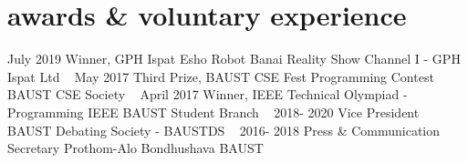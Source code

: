 \section*{awards \& voluntary experience}
\begin{entrylist}
	\myentry
	{July 2019}
	{Winner, {\normalfont GPH Ispat Esho Robot Banai Reality Show}}
	{Channel I - GPH Ispat Ltd}
	~
	\myentry
	{May 2017}
	{Third Prize, {\normalfont BAUST CSE Fest Programming Contest}}
	{BAUST CSE Society}
	~
	\myentry
	{April 2017}
	{Winner, {\normalfont IEEE Technical Olympiad - Programming}}
	{IEEE BAUST Student Branch}
	~
	\myentry
	{2018- 2020}
	{Vice President}
	{BAUST Debating Society - BAUSTDS}
	~
	\myentry
	{2016- 2018}
	{Press \& Communication Secretary}
	{Prothom-Alo Bondhushava BAUST}
	~

\end{entrylist}